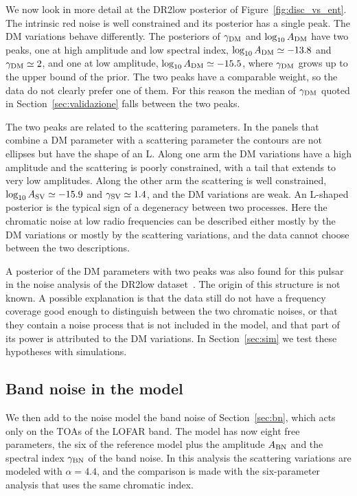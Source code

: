 We now look in more detail at the DR2low posterior of
Figure~\ref{fig:disc_vs_ent}. The intrinsic red noise is well constrained
and its posterior has a single peak. The DM variations behave differently.
The posteriors of $\gamma_{\rm DM}$ and $\log_{10}A_{\rm DM}$ have two
peaks, one at high amplitude and low spectral index,
$\log_{10}A_{\rm DM} \simeq -13.8$ and $\gamma_{\rm DM} \simeq 2$, and one
at low amplitude, $\log_{10}A_{\rm DM} \simeq -15.5$, where
$\gamma_{\rm DM}$ grows up to the upper bound of the prior. The two peaks
have a comparable weight, so the data do not clearly prefer one of them.
For this reason the median of $\gamma_{\rm DM}$ quoted in
Section~\ref{sec:validazione} falls between the two peaks.

The two peaks are related to the scattering parameters. In the panels that
combine a DM parameter with a scattering parameter the contours are not
ellipses but have the shape of an L. Along one arm the DM variations have
a high amplitude and the scattering is poorly constrained, with a tail
that extends to very low amplitudes. Along the other arm the scattering is
well constrained, $\log_{10}A_{\rm SV} \simeq -15.9$ and
$\gamma_{\rm SV} \simeq 1.4$, and the DM variations are weak. An L-shaped
posterior is the typical sign of a degeneracy between two processes. Here
the chromatic noise at low radio frequencies can be described either
mostly by the DM variations or mostly by the scattering variations, and
the data cannot choose between the two descriptions.

A posterior of the DM parameters with two peaks was also found for this
pulsar in the noise analysis of the DR2low dataset~\cite{Iraci2025}. The origin of this
structure is not known. A possible explanation is that the data still do
not have a frequency coverage good enough to distinguish between the two
chromatic noises, or that they contain a noise process that is not included
in the model, and that part of its power is attributed to the DM
variations. In Section~\ref{sec:sim} we test these hypotheses with
simulations.

\subsection{Band noise in the model} \label{sec:bn_reali}

We then add to the noise model the band noise of Section~\ref{sec:bn},
which acts only on the TOAs of the LOFAR band. The model has now eight free
parameters, the six of the reference model plus the amplitude
$A_{\rm BN}$ and the spectral index $\gamma_{\rm BN}$ of the band noise. In
this analysis the scattering variations are modeled with $\alpha = 4.4$,
and the comparison is made with the six-parameter analysis that uses the
same chromatic index.


